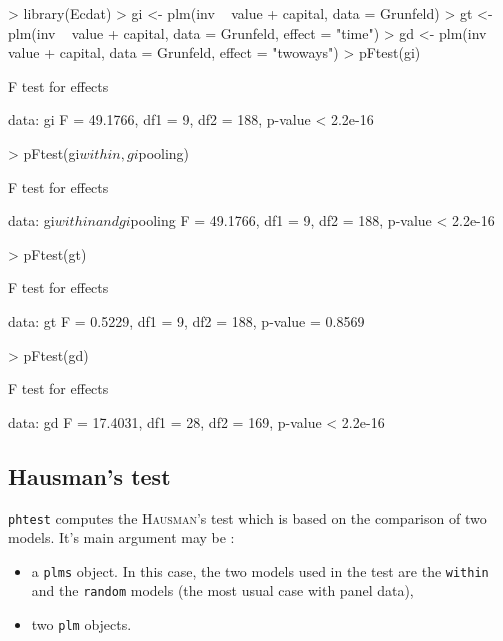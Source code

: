 \documentclass{article}
\begin{document}
\begin{Schunk}
\begin{Sinput}
> library(Ecdat)
> gi <- plm(inv ~ value + capital, data = Grunfeld)
> gt <- plm(inv ~ value + capital, data = Grunfeld, effect = "time")
> gd <- plm(inv ~ value + capital, data = Grunfeld, effect = "twoways")
> pFtest(gi)
\end{Sinput}
\begin{Soutput}
	F test for effects

data:  gi 
F = 49.1766, df1 = 9, df2 = 188, p-value < 2.2e-16
\end{Soutput}
\begin{Sinput}
> pFtest(gi$within, gi$pooling)
\end{Sinput}
\begin{Soutput}
	F test for effects

data:  gi$within and gi$pooling 
F = 49.1766, df1 = 9, df2 = 188, p-value < 2.2e-16
\end{Soutput}
\begin{Sinput}
> pFtest(gt)
\end{Sinput}
\begin{Soutput}
	F test for effects

data:  gt 
F = 0.5229, df1 = 9, df2 = 188, p-value = 0.8569
\end{Soutput}
\begin{Sinput}
> pFtest(gd)
\end{Sinput}
\begin{Soutput}
	F test for effects

data:  gd 
F = 17.4031, df1 = 28, df2 = 169, p-value < 2.2e-16
\end{Soutput}
\end{Schunk}



\subsection{Hausman's test}

\texttt{phtest} computes the \textsc{Hausman}'s test which is based on
the  comparison of two models. It's main argument may be :

\begin{itemize}
\item a \texttt{plms} object. In this case, the two models used in the
  test are the \texttt{within} and the \texttt{random} models (the
  most usual case with panel data),
\item two \texttt{plm} objects.
\end{itemize}
\end{document}
